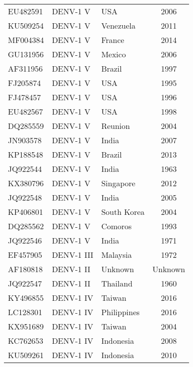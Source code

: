 \begin{scriptsize}
\begin{center}
\begin{longtable}{@{}lllc@{}}
EU482591 & DENV-1 V            & USA         & 2006            \\
KU509254 & DENV-1 V            & Venezuela   & 2011            \\
MF004384 & DENV-1 V            & France      & 2014            \\
GU131956 & DENV-1 V            & Mexico      & 2006            \\
AF311956 & DENV-1 V            & Brazil      & 1997            \\
FJ205874 & DENV-1 V            & USA         & 1995            \\
FJ478457 & DENV-1 V            & USA         & 1996            \\
EU482567 & DENV-1 V            & USA         & 1998            \\
DQ285559 & DENV-1 V            & Reunion     & 2004            \\
JN903578 & DENV-1 V            & India       & 2007            \\
KP188548 & DENV-1 V            & Brazil      & 2013            \\
JQ922544 & DENV-1 V            & India       & 1963            \\
KX380796 & DENV-1 V            & Singapore   & 2012            \\
JQ922548 & DENV-1 V            & India       & 2005            \\
KP406801 & DENV-1 V            & South Korea & 2004            \\
DQ285562 & DENV-1 V            & Comoros     & 1993            \\
JQ922546 & DENV-1 V            & India       & 1971            \\
EF457905 & DENV-1 III          & Malaysia    & 1972            \\
AF180818 & DENV-1 II           & Unknown     & Unknown         \\
JQ922547 & DENV-1 II           & Thailand    & 1960            \\
KY496855 & DENV-1 IV           & Taiwan      & 2016            \\
LC128301 & DENV-1 IV           & Philippines & 2016            \\
KX951689 & DENV-1 IV           & Taiwan      & 2004            \\
KC762653 & DENV-1 IV           & Indonesia   & 2008            \\
KU509261 & DENV-1 IV           & Indonesia   & 2010            \\

\end{longtable}
\end{center}
\end{scriptsize}
